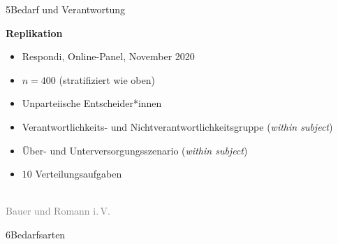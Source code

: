 \documentclass[xcolor=table,9pt,aspectratio=169]{beamer}
\begin{document}
\begin{frame}{\vspace*{10mm}5\hspace*{1em}Bedarf und Verantwortung}
\begin{multicols}{2}
   \textbf{Replikation}\\
   \medskip
   \begin{itemize}
      \item Respondi, Online-Panel, November 2020
      \item $n=400$ (stratifiziert wie oben)
      \item Unparteiische Entscheider*innen
      \item Verantwortlichkeits- und Nichtverantwortlichkeitsgruppe (\textit{within subject})
      \item Über- und Unterversorgungsszenario (\textit{within subject})
      \item $10$ Verteilungsaufgaben
   \end{itemize}
   \vfill
   \begin{center}
      \\
      \textcolor{gray}{Bauer und Romann i.\,V.}
   \end{center}
\end{multicols}
\end{frame}


\begin{frame}
\begin{overlayarea}{\textwidth}{0.81\paperheight}{
   \vspace*{11mm}
   \textcolor{uolblue}
   {6\hspace*{1em}Bedarfsarten}
}
\end{overlayarea}
\end{frame}
\end{document}
